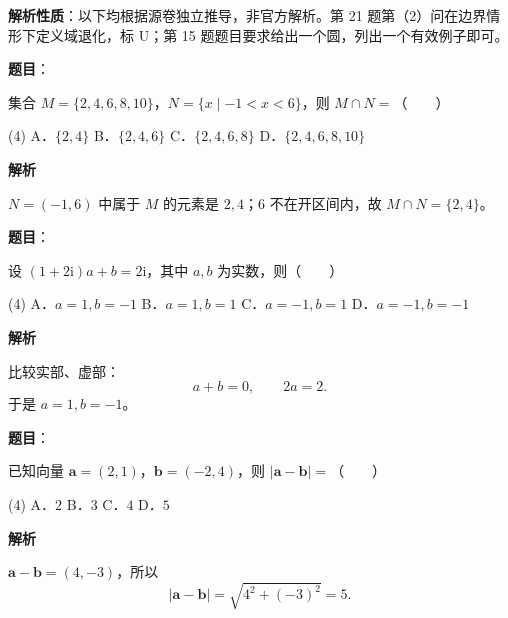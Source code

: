 

\begin{gktip}
\textbf{解析性质}：以下均根据源卷独立推导，非官方解析。第 21 题第（2）问在边界情形下定义域退化，标 U；第 15 题题目要求给出一个圆，列出一个有效例子即可。
\end{gktip}


\begin{answer}

\textbf{题目}：

集合 $M=\{2,4,6,8,10\}$，$N=\{x\mid-1<x<6\}$，则 $M\cap N=$\mbox{（　　）}

\begin{gkopts}(4)
\task A．$\{2,4\}$
\task B．$\{2,4,6\}$
\task C．$\{2,4,6,8\}$
\task D．$\{2,4,6,8,10\}$
\end{gkopts}

\textbf{解析}

$N=(-1,6)$ 中属于 $M$ 的元素是 $2,4$；$6$ 不在开区间内，故 $M\cap N=\{2,4\}$。


\end{answer}
\begin{answer}

\textbf{题目}：

设 $(1+2\mathrm i)a+b=2\mathrm i$，其中 $a,b$ 为实数，则\mbox{（　　）}

\begin{gkopts}(4)
\task A．$a=1,b=-1$
\task B．$a=1,b=1$
\task C．$a=-1,b=1$
\task D．$a=-1,b=-1$
\end{gkopts}

\textbf{解析}

比较实部、虚部：
\nopagebreak[4]
\[
a+b=0,\qquad 2a=2.
\]
于是 $a=1,b=-1$。


\end{answer}
\begin{answer}

\textbf{题目}：

已知向量 $\boldsymbol a=(2,1)$，$\boldsymbol b=(-2,4)$，则 $\lvert\boldsymbol a-\boldsymbol b\rvert=$\mbox{（　　）}

\begin{gkopts}(4)
\task A．$2$
\task B．$3$
\task C．$4$
\task D．$5$
\end{gkopts}

\textbf{解析}

$\boldsymbol a-\boldsymbol b=(4,-3)$，所以
\nopagebreak[4]
\[
\lvert\boldsymbol a-\boldsymbol b\rvert=\sqrt{4^2+(-3)^2}=5.
\]


\end{answer}
